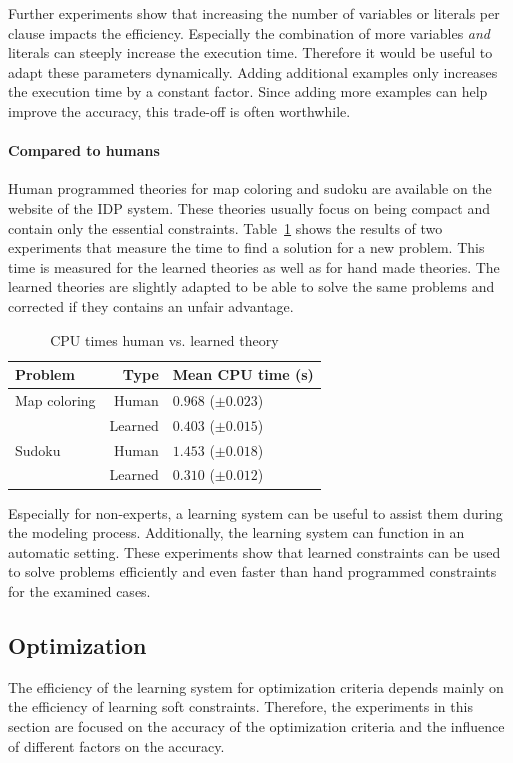 \documentclass[letterpaper]{article}
\theoremstyle{definition}
\begin{document}
Further experiments show that increasing the number of variables or literals per clause impacts the efficiency.
Especially the combination of more variables \emph{and} literals can steeply increase the execution time.
Therefore it would be useful to adapt these parameters dynamically.
Adding additional examples only increases the execution time by a constant factor.
Since adding more examples can help improve the accuracy, this trade-off is often worthwhile.

\paragraph{Compared to humans}
Human programmed theories for map coloring and sudoku are available on the website of the IDP system.
These theories usually focus on being compact and contain only the essential constraints.
Table~\ref{tbl:mens} shows the results of two experiments that measure the time to find a solution for a new problem.
This time is measured for the learned theories as well as for hand made theories.
The learned theories are slightly adapted to be able to solve the same problems and corrected if they contains an unfair advantage.
  \begin{table}
    \caption{CPU times human vs. learned theory}
    \begin{tabularx}{\linewidth}{lr|X}
      \textbf{Problem} & \textbf{Type} & \textbf{Mean CPU time (s)} \\
      \toprule
      Map coloring & Human & $0.968$  ($\pm 0.023$) \\
      & Learned & $0.403$       ($\pm 0.015$) \\
      \midrule
      Sudoku & Human & $1.453$    ($\pm 0.018$) \\ 
      & Learned & $0.310$       ($\pm 0.012$)
    \end{tabularx}
    \label{tbl:mens}
  \end{table}

Especially for non-experts, a learning system can be useful to assist them during the modeling process.
Additionally, the learning system can function in an automatic setting.
These experiments show that learned constraints can be used to solve problems efficiently and even faster than hand programmed constraints for the examined cases.

\subsection{Optimization}
The efficiency of the learning system for optimization criteria depends mainly on the efficiency of learning soft constraints.
Therefore, the experiments in this section are focused on the accuracy of the optimization criteria and the influence of different factors on the accuracy.
\end{document}

